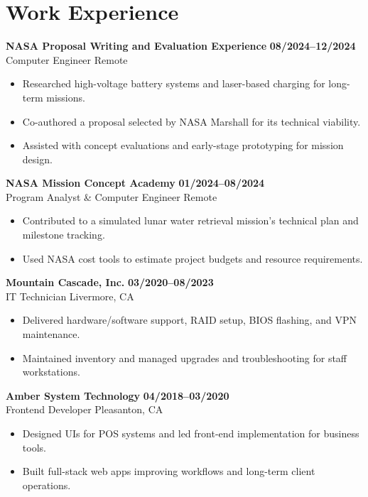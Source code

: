 \documentclass[letterpaper,11pt]{article}
\begin{document}
\section*{Work Experience}
\textbf{NASA Proposal Writing and Evaluation Experience} \hfill \textbf{08/2024–12/2024} \\
Computer Engineer \hfill Remote
\begin{itemize}
    \item Researched high-voltage battery systems and laser-based charging for long-term missions.
    \item Co-authored a proposal selected by NASA Marshall for its technical viability.
    \item Assisted with concept evaluations and early-stage prototyping for mission design.
\end{itemize}
\textbf{NASA Mission Concept Academy} \hfill \textbf{01/2024–08/2024} \\
Program Analyst \& Computer Engineer \hfill Remote
\begin{itemize}
    \item Contributed to a simulated lunar water retrieval mission's technical plan and milestone tracking.
    \item Used NASA cost tools to estimate project budgets and resource requirements.
\end{itemize}
\textbf{Mountain Cascade, Inc.} \hfill \textbf{03/2020–08/2023} \\
IT Technician \hfill Livermore, CA
\begin{itemize}
    \item Delivered hardware/software support, RAID setup, BIOS flashing, and VPN maintenance.
    \item Maintained inventory and managed upgrades and troubleshooting for staff workstations.
\end{itemize}
\textbf{Amber System Technology} \hfill \textbf{04/2018–03/2020} \\
Frontend Developer \hfill Pleasanton, CA
\begin{itemize}
    \item Designed UIs for POS systems and led front-end implementation for business tools.
    \item Built full-stack web apps improving workflows and long-term client operations.
\end{itemize}
\end{document}
